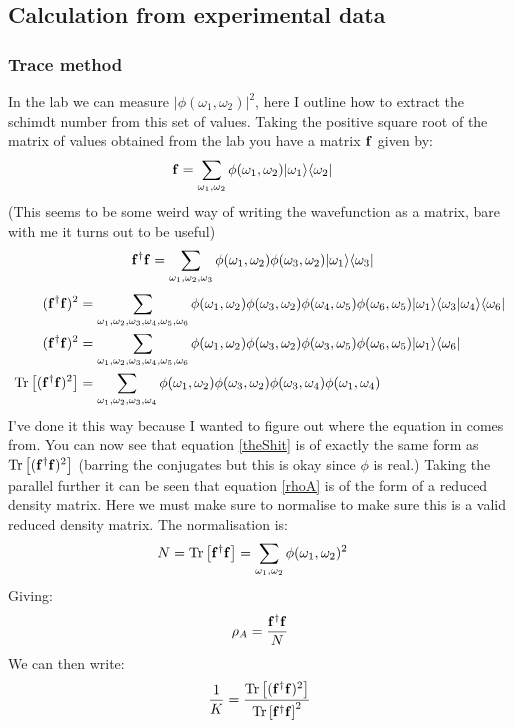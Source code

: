 \subsection{Calculation from experimental data}
\subsubsection{Trace method}
In the lab we can measure $|\phi(\omega_1,\omega_2)|^2$, here I outline how to extract the schimdt number from this set of values. Taking the positive square root of the matrix of values obtained from the lab you have a matrix ${\bf f}$ given by:
\begin{align}
{\bf f}&=\sum_{\omega_1,\omega_2}\phi(\omega_1,\omega_2)|\omega_1\rangle\langle\omega_2|
\end{align}
(This seems to be some weird way of writing the wavefunction as a matrix, bare with me it turns out to be useful)
\begin{align}\label{rhoA}
{\bf f}^{\dagger}{\bf f}&=\sum_{\omega_1,\omega_2,\omega_3}\phi(\omega_1,\omega_2)\phi(\omega_3,\omega_2)|\omega_1\rangle\langle\omega_3|
\end{align}
\begin{align}
({\bf f}^{\dagger}{\bf f})^2&=\sum_{\omega_1,\omega_2,\omega_3,\omega_4,\omega_5,\omega_6}\phi(\omega_1,\omega_2)\phi(\omega_3,\omega_2)\phi(\omega_4,\omega_5)\phi(\omega_6,\omega_5)|\omega_1\rangle\langle\omega_3|\omega_4\rangle\langle\omega_6|\\
({\bf f}^{\dagger}{\bf f})^2&=\sum_{\omega_1,\omega_2,\omega_3,\omega_4,\omega_5,\omega_6}\phi(\omega_1,\omega_2)\phi(\omega_3,\omega_2)\phi(\omega_3,\omega_5)\phi(\omega_6,\omega_5)|\omega_1\rangle\langle\omega_6|\\
\operatorname{Tr}\left [({\bf f}^{\dagger}{\bf f})^2 \right ]&=\sum_{\omega_1,\omega_2,\omega_3,\omega_4}\phi(\omega_1,\omega_2)\phi(\omega_3,\omega_2)\phi(\omega_3,\omega_4)\phi(\omega_1,\omega_4)
\end{align}
I've done it this way because I wanted to figure out where the equation in \cite{eckstein_high-resolution_2014} comes from. You can now see that equation \ref{theShit} is of exactly the same form as $\operatorname{Tr}\left [({\bf f}^{\dagger}{\bf f})^2 \right ]$ (barring the conjugates but this is okay since $\phi$ is real.) Taking the parallel further it can be seen that equation \ref{rhoA} is of the form of a reduced density matrix. Here we must make sure to normalise to make sure this is a valid reduced density matrix. The normalisation is:
\begin{align}
N = \operatorname{Tr}\left [{\bf f}^{\dagger}{\bf f} \right ]&=\sum_{\omega_1,\omega_2}\phi(\omega_1,\omega_2)^2
\end{align}
Giving:
\begin{align}
\rho_A = \frac{{\bf f}^{\dagger}{\bf f}}{N}
\end{align}
We can then write:
\begin{align}
\frac{1}{K}=\frac{\operatorname{Tr}\left [({\bf f}^{\dagger}{\bf f})^2 \right ]}{\operatorname{Tr}\left [{\bf f}^{\dagger}{\bf f} \right ]^2}
\end{align}
